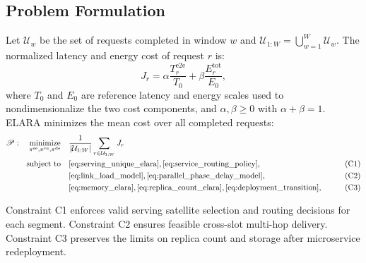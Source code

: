 \documentclass[10pt, conference, letterpaper]{IEEEtran}
\begin{document}
\subsection{Problem Formulation}
Let $\mathcal U_w$ be the set of requests completed in window $w$ and $\mathcal U_{1:W}=\bigcup_{w=1}^{W}\mathcal U_w$. The normalized latency and energy cost of request $r$ is:
\begin{equation}
J_r=\alpha\frac{T_r^{\text{e2e}}}{T_0}
+\beta\frac{E_r^{\text{tot}}}{E_0},
\label{eq:request_cost_elara}
\end{equation}
where $T_0$ and $E_0$ are reference latency and energy scales used to
nondimensionalize the two cost components, and $\alpha,\beta\geq0$ with $\alpha+\beta=1$. ELARA minimizes the mean cost over all completed requests:
\begin{align}
\label{eq:elara_prob_form}
\mathscr{P}: \quad \underset{\pi^{\text{se}},\pi^{\text{ru}},\pi^{\text{de}}}{\operatorname{minimize}} \quad &\frac{1}{|\mathcal U_{1:W}|} \sum_{r\in\mathcal U_{1:W}}J_r \\
\text{subject to}\quad
&\eqref{eq:serving_unique_elara},
\eqref{eq:service_routing_policy},
&\tag{C1}\\
&\eqref{eq:link_load_model},
\eqref{eq:parallel_phase_delay_model},
&\tag{C2}\\
&\eqref{eq:memory_elara},
\eqref{eq:replica_count_elara},
\eqref{eq:deployment_transition},
&\tag{C3}
\end{align}

Constraint C1 enforces valid serving satellite selection and routing decisions for each segment. Constraint C2 ensures feasible cross-slot multi-hop delivery. Constraint C3 preserves the limits on replica count and storage after microservice redeployment.

\end{document}
